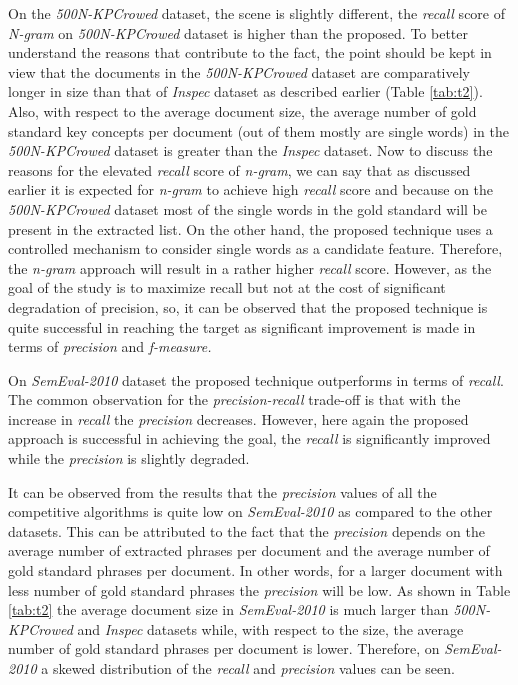 \documentclass{ieeeaccess}
\begin{document}
\begin{enumerate}
\hspace{1ex}On the \textit{500N-KPCrowed} dataset, the scene is slightly different, the \textit{recall} score of \textit{N-gram} on \textit{500N-KPCrowed} dataset is  higher than the proposed. To better understand the reasons that contribute to the fact, the point should be kept in view that the documents in the \textit{500N-KPCrowed} dataset are comparatively longer in size than that of \textit{Inspec} dataset as described earlier (Table \ref{tab:t2}). Also, with respect to the average document size, the average number of gold standard key concepts per  document (out of them mostly are single words) in the \textit{500N-KPCrowed} dataset is greater than the \textit{Inspec} dataset. Now to  discuss the reasons for the elevated \textit{recall} score of \textit{n-gram}, we can say that as discussed earlier it is expected for \textit{n-gram} to achieve high \textit{recall} score and because on the \textit{500N-KPCrowed} dataset most of the single words in the gold standard will be present in the extracted list. On the other hand, the proposed technique uses a controlled mechanism to consider single words as a candidate feature. Therefore, the \textit{n-gram} approach will result in a rather higher \textit{recall} score. However, as the goal of the study is to maximize recall but not at the cost of significant degradation of precision, so, it can be observed that the proposed technique is quite successful in reaching the target as significant improvement is made in terms of \textit{precision} and \textit{f-measure.}

\hspace{1ex}On \textit{SemEval-2010} dataset the proposed technique outperforms in terms of \textit{recall}. The  common observation for the \textit{precision-recall} trade-off is that with the increase in \textit{recall} the \textit{precision} decreases. However, here again the proposed approach is successful in achieving the goal, the \textit{recall} is significantly improved while the \textit{precision} is slightly degraded. 

\hspace{1ex}It can be observed from the results that the \textit{precision} values of all the competitive algorithms is quite low on \textit{SemEval-2010} as compared to the other datasets. This can be attributed to the fact that the \textit{precision} depends on the average number of extracted phrases per document and the average number of gold standard phrases per document. In other words, for a larger document with less number of gold standard phrases the \textit{precision} will be low.  As shown in Table \ref{tab:t2} the average document size in \textit{SemEval-2010} is much larger than \textit{500N-KPCrowed} and \textit{Inspec} datasets while, with respect to the size, the average number of gold standard phrases per document is lower. Therefore, on \textit{SemEval-2010} a skewed distribution of the \textit{recall} and \textit{precision} values can be seen.


\end{enumerate}
\end{document}
